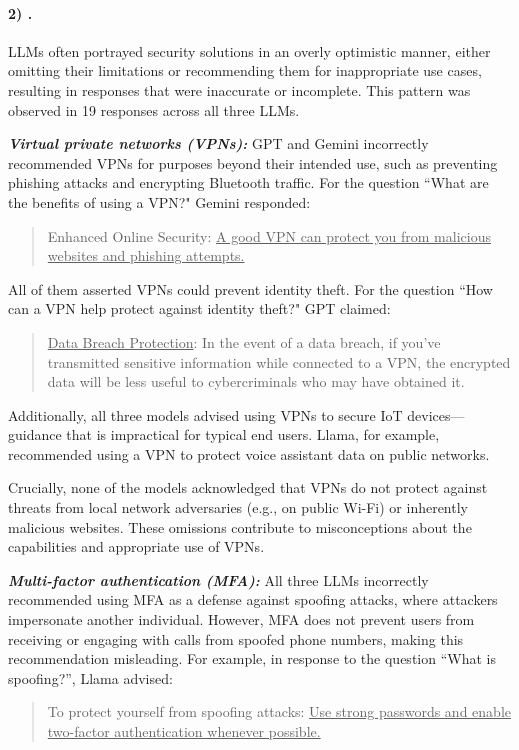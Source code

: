     \paragraph{2) \Overprescription.} LLMs often portrayed security solutions in an overly optimistic manner, either omitting their limitations or recommending them for inappropriate use cases, resulting in responses that were inaccurate or incomplete. This pattern was observed in 19 responses across all three LLMs.
    

        
    \noindent \textit{\textbf{Virtual private networks (VPNs):}} GPT and Gemini incorrectly recommended VPNs for purposes beyond their intended use, such as preventing phishing attacks and encrypting Bluetooth traffic. For the question “What are the benefits of using a VPN?" Gemini responded:
                        \begin{quote}
                        Enhanced Online Security: \uline{A good VPN can protect you from malicious websites and phishing attempts.}
                        \end{quote}
            
            All of them asserted VPNs could prevent identity theft. For the question “How can a VPN help protect against identity theft?" GPT claimed:
                        \begin{quote}
                            \underline{Data Breach Protection}: In the event of a data breach, if you’ve transmitted sensitive information while connected to a VPN, the encrypted data will be less useful to cybercriminals who may have obtained it.
                        \end{quote}

            Additionally, all three models advised using VPNs to secure IoT devices—guidance that is impractical for typical end users. Llama, for example, recommended using a VPN to protect voice assistant data on public networks.
            
            Crucially, none of the models acknowledged that VPNs do not protect against threats from local network adversaries (e.g., on public Wi-Fi) or inherently malicious websites. These omissions contribute to misconceptions about the capabilities and appropriate use of VPNs.

    \noindent \textit{\textbf{Multi-factor authentication (MFA):}} All three LLMs incorrectly recommended using MFA as a defense against spoofing attacks, where attackers impersonate another individual. However, MFA does not prevent users from receiving or engaging with calls from spoofed phone numbers, making this recommendation misleading. For example, in response to the question “What is spoofing?”, Llama advised:
            \begin{quote}
            To protect yourself from spoofing attacks: \uline{Use strong passwords and enable two-factor authentication whenever possible.}
            \end{quote}


